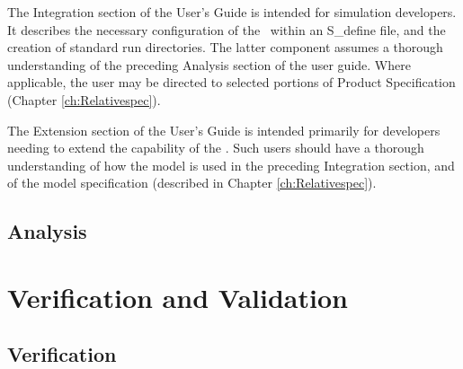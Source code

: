 The Integration section of the User's Guide is intended for simulation
developers.
It describes the necessary configuration of the \RelativeDesc\
within an
S\_define file, and the creation of standard run directories.  The
latter
component assumes a thorough understanding of the preceding Analysis
section of the user guide.
Where applicable, the user may be directed to selected portions of
Product Specification (Chapter \ref{ch:Relativespec}).

The Extension section of the User's Guide is intended primarily for
developers
needing to extend the capability of the \RelativeDesc.  Such users
should have a
thorough understanding of how the model is used in the preceding
Integration section, and of the model
specification (described in Chapter \ref{ch:Relativespec}).


\section{Analysis}






\chapter{Verification and
Validation}\label{ch:Relativeivv}

\section{Verification}





